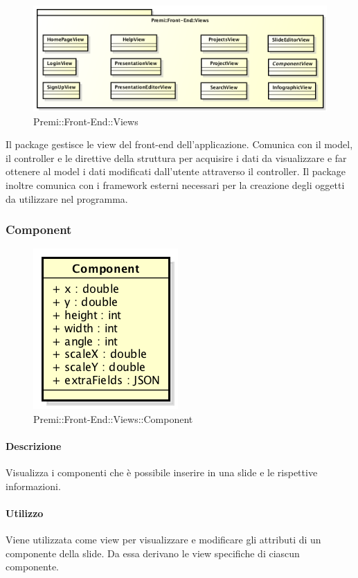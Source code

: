 \begin{figure}[h]
	\centering
	\includegraphics[width=0.7\linewidth]{img/premi_front_end_views}
	\caption[Premi::Front-End::Views]{Premi::Front-End::Views}
\end{figure}
Il package gestisce le view del front-end dell'applicazione. Comunica con il model, il controller e le direttive della struttura per acquisire i dati da visualizzare e far ottenere al model i dati modificati dall'utente attraverso il controller. Il package inoltre comunica con i framework esterni necessari per la creazione degli oggetti da utilizzare nel programma.

\subsubsection{Component}
	\begin{figure}[h]
		\centering
		\includegraphics[width=0.3\linewidth]{img/premi_front_end_views_component}
		\caption[Premi::Front-End::Views::Component]{Premi::Front-End::Views::Component}
	\end{figure}
	
	\paragraph{Descrizione}
	Visualizza i componenti che è possibile inserire in una slide e le rispettive informazioni.
	
	\paragraph{Utilizzo}
	Viene utilizzata come view per visualizzare e modificare gli attributi di un componente della slide. Da essa derivano le view specifiche di ciascun componente.
	
